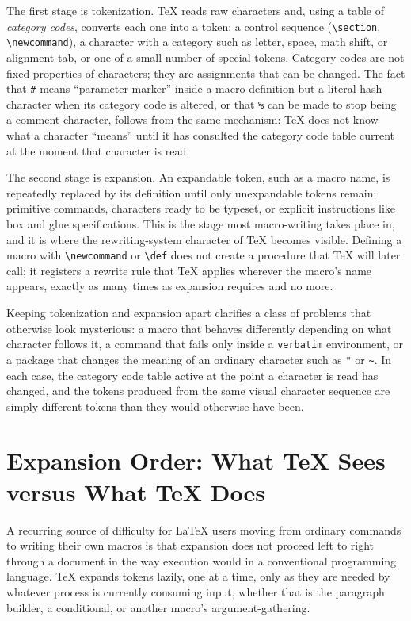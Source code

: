 The first stage is tokenization. TeX reads raw characters and, using a table of \emph{category codes}, converts each one into a token: a control sequence (\texttt{\textbackslash{}section}, \texttt{\textbackslash{}newcommand}), a character with a category such as letter, space, math shift, or alignment tab, or one of a small number of special tokens. Category codes are not fixed properties of characters; they are assignments that can be changed. The fact that \texttt{\#} means ``parameter marker'' inside a macro definition but a literal hash character when its category code is altered, or that \texttt{\%} can be made to stop being a comment character, follows from the same mechanism: TeX does not know what a character ``means'' until it has consulted the category code table current at the moment that character is read.

The second stage is expansion. An expandable token, such as a macro name, is repeatedly replaced by its definition until only unexpandable tokens remain: primitive commands, characters ready to be typeset, or explicit instructions like box and glue specifications. This is the stage most macro-writing takes place in, and it is where the rewriting-system character of TeX becomes visible. Defining a macro with \texttt{\textbackslash{}newcommand} or \texttt{\textbackslash{}def} does not create a procedure that TeX will later call; it registers a rewrite rule that TeX applies wherever the macro's name appears, exactly as many times as expansion requires and no more.

Keeping tokenization and expansion apart clarifies a class of problems that otherwise look mysterious: a macro that behaves differently depending on what character follows it, a command that fails only inside a \texttt{verbatim} environment, or a package that changes the meaning of an ordinary character such as \texttt{"} or \texttt{\textasciitilde{}}. In each case, the category code table active at the point a character is read has changed, and the tokens produced from the same visual character sequence are simply different tokens than they would otherwise have been.

\hypertarget{expansion-order-what-tex-sees-versus-what-tex-does}{%
\section{Expansion Order: What TeX Sees versus What TeX Does}\label{expansion-order-what-tex-sees-versus-what-tex-does}}

A recurring source of difficulty for LaTeX users moving from ordinary commands to writing their own macros is that expansion does not proceed left to right through a document in the way execution would in a conventional programming language. TeX expands tokens lazily, one at a time, only as they are needed by whatever process is currently consuming input, whether that is the paragraph builder, a conditional, or another macro's argument-gathering.

